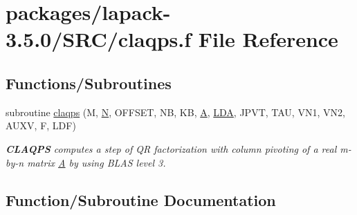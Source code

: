 \hypertarget{claqps_8f}{}\section{packages/lapack-\/3.5.0/\+S\+R\+C/claqps.f File Reference}
\label{claqps_8f}
\subsection*{Functions/\+Subroutines}
\begin{DoxyCompactItemize}
\item 
subroutine \hyperlink{claqps_8f_ab49e6140e8e4e82cb86ee10aa6c8a49a}{claqps} (M, \hyperlink{polmisc_8c_a0240ac851181b84ac374872dc5434ee4}{N}, O\+F\+F\+S\+E\+T, N\+B, K\+B, \hyperlink{classA}{A}, \hyperlink{example__user_8c_ae946da542ce0db94dced19b2ecefd1aa}{L\+D\+A}, J\+P\+V\+T, T\+A\+U, V\+N1, V\+N2, A\+U\+X\+V, F, L\+D\+F)
\begin{DoxyCompactList}\small\item\em {\bfseries C\+L\+A\+Q\+P\+S} computes a step of Q\+R factorization with column pivoting of a real m-\/by-\/n matrix \hyperlink{classA}{A} by using B\+L\+A\+S level 3. \end{DoxyCompactList}\end{DoxyCompactItemize}


\subsection{Function/\+Subroutine Documentation}
\hypertarget{claqps_8f_ab49e6140e8e4e82cb86ee10aa6c8a49a}{}
